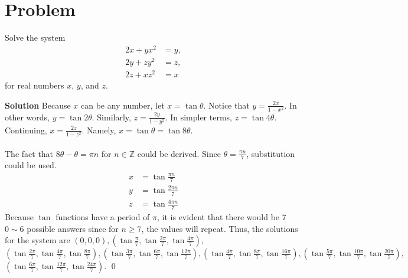 \documentclass{article}
\newenvironment{solution}{\begin{trivlist}\item[]{\bf Solution}}{\qed \end{trivlist}}
\begin{document}
\section*{Problem}
Solve the system
\begin{align*}
    2x + yx^2 &= y, \\
    2y + zy^2 &= z, \\
    2z + xz^2 &= x
\end{align*}
for real numbers $x$, $y$, and $z$.
\begin{solution}
Because $x$ can be any number, let $x = \tan\theta$. Notice that $y = \frac{2x}{1 - x^2}$. In other words, $y = \tan2\theta$. Similarly, $z = \frac{2y}{1 - y^2}$. In simpler terms, $z = \tan4\theta$. Continuing, $x = \frac{2z}{1 - z^2}$. Namely, $x = \tan\theta = \tan8\theta$.
\\\\
The fact that $8\theta - \theta = \pi n$ for $n \in \mathbb{Z}$ could be derived. Since $\theta = \frac{\pi n}{7}$, substitution could be used.
\begin{align*}
    x &= \tan\frac{\pi n}{7} \\
    y &= \tan\frac{2\pi n}{7} \\
    z &= \tan\frac{4\pi n}{7}
\end{align*}
Because $\tan$ functions have a period of $\pi$, it is evident that there would be $7$ $0\sim6$ possible answers since for $n \ge 7$, the values will repeat. Thus, the solutions for the system are $\boxed{(0,0,0), \left( \tan\frac{\pi}{7}, \tan\frac{2\pi}{7}, \tan\frac{4\pi}{7} \right),}$ $\boxed{\left( \tan\frac{2\pi}{7}, \tan\frac{4\pi}{7}, \tan\frac{8\pi}{7} \right), \left( \tan\frac{3\pi}{7}, \tan\frac{6\pi}{7}, \tan\frac{12\pi}{7} \right), \left( \tan\frac{4\pi}{7}, \tan\frac{8\pi}{7}, \tan\frac{16\pi}{7} \right), \left( \tan\frac{5\pi}{7}, \tan\frac{10\pi}{7}, \tan\frac{20\pi}{7} \right),}$ $\boxed{\left( \tan\frac{6\pi}{7}, \tan\frac{12\pi}{7}, \tan\frac{24\pi}{7} \right)}$.
\end{solution}
\end{document}
